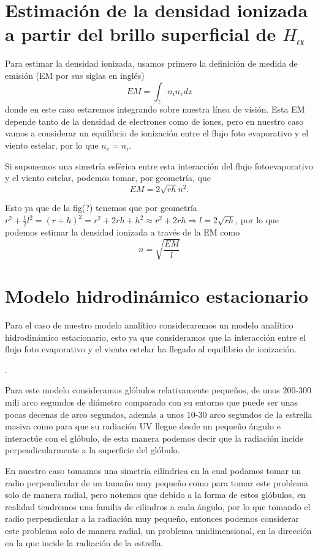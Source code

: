 \documentclass{book}
\begin{document}
\section{Estimación de la densidad ionizada a partir del brillo superficial de $H_\alpha$}

Para estimar la densidad ionizada, usamos primero la definición de medida de emisión (EM por sus siglas en inglés)
\[EM=\int_z n_in_edz\] donde en este caso estaremos integrando sobre nuestra línea de visión. Esta EM depende tanto de la densidad de electrones como de iones, pero en nuestro caso vamos a considerar un equilibrio de ionización entre el flujo foto evaporativo y el viento estelar, por lo que $n_e=n_i$.

Si suponemos una simetría esférica entre esta interacción del flujo fotoevaporativo y el viento estelar, podemos tomar, por geometría, que
\[EM=2\sqrt{rh}n^2.\]


Esto ya que de la fig(?) tenemos que por geometría $r^2+\frac{1}{2}l^2=(r+h)^2=r^2+2rh+h^2\approx r^2+2rh\Rightarrow l=2\sqrt{rh}$, por lo que podemos estimar la densidad ionizada a través de la EM como \[n=\sqrt{\frac{EM}{l}}\]

\section{Modelo hidrodinámico estacionario}

Para el caso de nuestro modelo analítico consideraremos un modelo analítico hidrodinámico estacionario, esto ya que consideramos que la interacción entre el flujo foto evaporativo y el viento estelar ha llegado al equilibrio de ionización.

.

Para este modelo consideramos glóbulos relativamente pequeños, de unos 200-300 mili arco segundos de diámetro comparado con su entorno que puede ser unas pocas decenas de arco segundos, además a unos 10-30 arco segundos de la estrella masiva como para que su radiación UV llegue desde un pequeño ángulo e interactúe con el glóbulo, de esta manera podemos decir que la radiación incide perpendicularmente a la superficie del glóbulo.

En nuestro caso tomamos una simetría cilíndrica en la cual podamos tomar un radio perpendicular de un tamaño muy pequeño como para tomar este problema solo de manera radial, pero notemos que debido a la forma de estos glóbulos, en realidad tendremos una familia de cilindros a cada ángulo, por lo que tomando el radio perpendicular a la radiación muy pequeño, entonces podemos considerar este problema solo de manera radial, un problema unidimensional, en la dirección en la que incide la radiación de la estrella.
\end{document}
